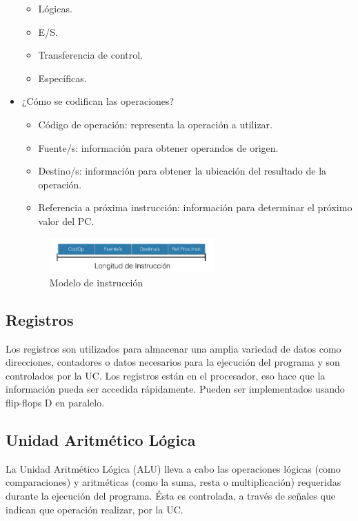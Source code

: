 \documentclass[a4paper,12pt]{article}
\begin{document}
\begin{itemize}
\begin{itemize}
    \item Lógicas.
    \item E/S.
    \item Transferencia de control.
    \item Específicas.
  \end{itemize}
  \item ¿Cómo se codifican las operaciones?
  \begin{itemize}
    \item Código de operación: representa la operación a utilizar.
    \item Fuente/s: información para obtener operandos de origen.
    \item Destino/s: información para obtener la ubicación del resultado de la
    operación.
    \item Referencia a próxima instrucción: información para determinar el próximo valor del PC.
  \end{itemize}

  \begin{figure}[ht!]
    \centering
     \includegraphics[width=0.6\textwidth]{Imagenes/ISA.png}
    \caption{Modelo de instrucción}
    \label{ISA}
  \end{figure}
\end{itemize}




\subsection{Registros}
Los registros son utilizados para almacenar una amplia variedad de datos como direcciones, contadores o datos necesarios
para la ejecución del programa y son controlados por la UC. Los registros están en el procesador, eso hace que la
información pueda ser accedida rápidamente. Pueden ser implementados usando flip-flops D en paralelo.

\subsection{Unidad Aritmético Lógica}
La Unidad Aritmético Lógica (ALU) lleva a cabo las operaciones lógicas (como comparaciones) y aritméticas (como la suma,
resta o multiplicación) requeridas durante la ejecución del programa. Ésta es controlada, a través de señales que indican
que operación realizar, por la UC.
\end{document}
